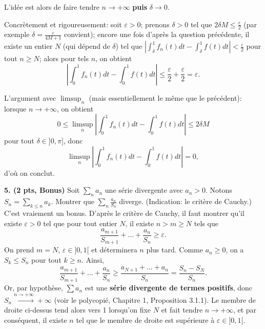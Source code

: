 \documentclass[a4paper,10pt]{article}
\newcommand{\R}{\mathbb{R}}
\newcommand{\abs}[1]{\left|#1\right|}
\newcommand{\correction}[1]{{\color{red}#1}}
\newcommand{\comment}[1]{{\color{blue}#1}}
\begin{document}
\begin{enumerate}[label=\alph*)]
{    \comment{L'idée est alors de faire tendre $n\to+\infty$ \textbf{puis} $\delta\to0$.}
    
    Concrètement et rigoureusement: soit $\varepsilon>0$; prenons $\delta>0$ tel que $2\delta M\leq\frac{\varepsilon}{2}$ (par exemple $\delta=\frac{\varepsilon}{4M+1}$ convient); encore une fois d'après la question précédente, il existe un entier $N$ \comment{(qui dépend de $\delta$)} tel que $\abs{\int_\delta^1 f_n(t)dt-\int_\delta^1 f(t)dt}<\frac{\varepsilon}{2}$ pour tout $n\geq N$; alors pour tels $n$, on obtient
    $$\abs{\int_0^1 f_n(t)dt-\int_0^1 f(t)dt}\leq \frac{\varepsilon}{2}+\frac{\varepsilon}{2}=\varepsilon.$$

    \comment{L'argument avec $\limsup_n$ (mais essentiellement le même que le précédent): lorsque $n\to+\infty$, on obtient
    $$0\leq\limsup_n\abs{\int_0^1 f_n(t)dt-\int_0^1 f(t)dt}\leq 2\delta M$$
    pour tout $\delta\in]0,\pi]$, donc
    $$\limsup_n\abs{\int_0^1 f_n(t)dt-\int_0^1 f(t)dt}=0,$$
    d'où on conclut.}
    }
\end{enumerate}



\vspace{.1in}

\noindent
\textbf{5. (2 pts, Bonus)}
Soit $\sum_n a_n$ une série divergente avec $a_n>0$. Notons $S_n=\sum_{k\leq n}a_k$. Montrer que $\sum_n \frac{a_n}{S_n}$ diverge. (Indication: le critère de Cauchy.)\\
\correction{C'est vraiement un bonus. D'après le critère de Cauchy, il faut montrer qu'il existe $\varepsilon>0$ tel que pour tout entier $N$, il existe $n>m\geq N$ tels que
$$\frac{a_{m+1}}{S_{m+1}}+\dots+\frac{a_n}{S_n}\geq\varepsilon.$$
On prend $m=N$, $\varepsilon\in]0,1[$ et déterminera $n$ plus tard. Comme $a_n\geq0$, on a $S_k\leq S_n$ pour tout $k\geq n$. Ainsi,
$$\frac{a_{m+1}}{S_{m+1}}+\dots+\frac{a_n}{S_n}\geq\frac{a_{N+1}+\dots+a_n}{S_n}=\frac{S_n-S_N}{S_n}.$$
Or, par hypothèse, $\sum a_n$ est une \textbf{série divergente de termes positifs}, donc $S_n\xrightarrow{n\to+\infty}+\infty$ (voir le polycopié, Chapitre 1, Proposition 3.1.1). Le membre de droite ci-dessus tend alors vers 1 lorsqu'on fixe $N$ et fait tendre $n\to+\infty$, et par conséquent, il existe $n$ tel que le membre de droite est supérieure à $\varepsilon\in]0,1[$. 
}
\end{document}

